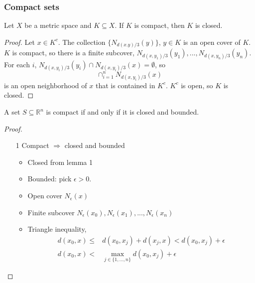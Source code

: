 \documentclass[compress]{beamer}
\def\R{\mathbb{R}}
\begin{document}
\begin{frame} 
  \frametitle{Compact sets}
  \begin{lemma}
    Let $X$ be a metric space and $K \subseteq X$. If $K$ is compact,
    then $K$ is closed.
  \end{lemma}
  \begin{proof}
    Let $x \in K^c$. The collection $\{N_{d(x.y)/3}(y)\}$, $y\in K$ is an
    open cover of $K$. $K$ is compact, so there is a finite subcover,
    $N_{d(x,y_1)/3}(y_1), ... , N_{d(x,y_n)/3}(y_n)$.  For each $i$,
    $N_{d(x,y_i)/3}(y_i) \cap N_{d(x,y_i)/3}(x) = \emptyset$, so 
    \[ \cap_{i=1}^n N_{d(x,y_i)/3}(x) \]
    is an open neighborhood of $x$ that is contained in $K^c$. $K^c$ is
    open, so $K$ is closed.
  \end{proof}
\end{frame}

\begin{frame}
  \begin{theorem}\label{thm:hb}
    A set $S \subseteq \R^n$ is compact if and only if it is closed and
    bounded. 
  \end{theorem}
  \begin{proof}
    \begin{itemize}
    \item[1] Compact $\Rightarrow$ closed and bounded
      \begin{itemize}
      \item Closed from lemma 1
      \item Bounded: pick $\epsilon>0$.
      \item Open cover $N_\epsilon(x)$ 
      \item Finite subcover
        $N_\epsilon(x_0), N_{\epsilon}(x_1), ... ,N_{\epsilon}(x_n)$
      \item Triangle inequality, 
        \begin{align}
          d(x_0,x) \leq & d(x_0,x_j) + d(x_j,x) < d(x_0,x_j) +
          \epsilon \\
          d(x_0,x) < & \max_{j\in\{1, ..., n\}} d(x_0,x_j) + \epsilon 
        \end{align}
      \end{itemize}
    \end{itemize}
  \end{proof}
\end{frame}
\end{document}
